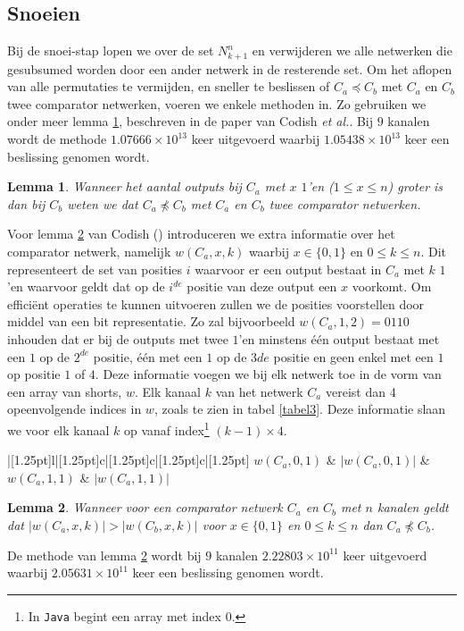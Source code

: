 \documentclass{article}
\newtheorem{lemma}{Lemma}
\begin{document}
\subsection{Snoeien}
Bij de snoei-stap lopen we over de set $N^n_{k+1}$ en verwijderen we alle netwerken die gesubsumed worden door een ander netwerk in de resterende set.
Om het aflopen van alle permutaties te vermijden, en sneller te beslissen of $C_a \preceq C_b$ met $C_a$ en $C_b$ twee comparator netwerken, voeren we enkele methoden in.
Zo gebruiken we onder meer lemma \ref{lemma3}, beschreven in de paper van Codish \textit{et al.}\cite{sortingNetworksSize2014}.
Bij $9$ kanalen wordt de methode $1.07666 \times 10^{13}$ keer uitgevoerd waarbij $1.05438 \times 10^{13}$ keer een beslissing genomen wordt. %
\begin{lemma}
	Wanneer het aantal outputs bij $C_a$ met $x$ $1$'en ($1 \leq x \leq n$) groter is dan bij $C_b$ weten we dat $C_a \npreceq C_b$ met $C_a$ en $C_b$ twee comparator netwerken.
\label{lemma3}
\end{lemma}
Voor lemma \ref{lemma4} van Codish (\cite{sortingNetworksSize2014}) introduceren we extra informatie over het comparator netwerk, namelijk $w\left(C_a, x, k\right)$ waarbij $x \in \{0,1\}$ en $0\leq k \leq n$.
Dit representeert de set van posities $i$ waarvoor er een output bestaat in $C_a$ met $k$ $1$'en waarvoor geldt dat op de $i^{de}$ positie van deze output een $x$ voorkomt. Om effici\"ent operaties te kunnen uitvoeren zullen we de posities voorstellen door middel van een bit representatie. Zo zal bijvoorbeeld $w\left(C_a, 1, 2\right) = 0110$ inhouden dat er bij de outputs met twee $1$'en minstens \'e\'en output bestaat met een $1$ op de $2^{de}$ positie, \'e\'en met een $1$ op de $3{de}$ positie en geen enkel met een $1$ op positie $1$ of $4$. Deze informatie voegen we bij elk netwerk toe in de vorm van een array van shorts, $w$. Elk kanaal $k$ van het netwerk $C_a$ vereist dan 4 opeenvolgende indices in $w$, zoals te zien in tabel \ref{tabel3}.
Deze informatie slaan we voor elk kanaal $k$ op vanaf index\footnote{In \texttt{Java} begint een array met index $0$.} $(k-1) \times 4$.
\begin{table}[!h]
	\centering
	\begin{tabu}{|[1.25pt]l|[1.25pt]c|[1.25pt]c|[1.25pt]c|[1.25pt]}
	\tabucline[1.25pt]{-}
	$w\left(C_a, 0, 1\right)$ & $|w\left(C_a, 0, 1\right)|$  & $w\left(C_a, 1, 1\right)$ & $|w\left(C_a, 1, 1\right)|$\\ 
	\tabucline[1.25pt]{-}
	\end{tabu} 
	\caption{De inhoud van $w$ op indices $0-3$ voor kanaal 1.}
	\label{tabel3} 
\end{table}
\begin{lemma}
	Wanneer voor een comparator netwerk $C_a$ en $C_b$ met $n$ kanalen geldt dat $|w\left(C_a, x, k\right)| > |w\left(C_b, x, k\right)|$ voor $x \in \{0,1\}$ en $0 \leq k \leq n$ dan $C_a \npreceq C_b$.
	\label{lemma4}
\end{lemma}
De methode van lemma \ref{lemma4} wordt bij $9$ kanalen ${2.22803 \times 10^{11}}$ keer uitgevoerd waarbij $2.05631 \times 10^{11}$ keer een beslissing genomen wordt.
\end{document}
